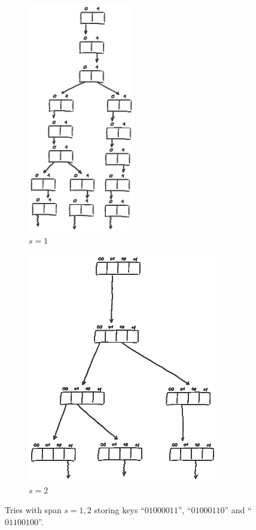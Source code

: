 \documentclass[abstracton,12pt]{scrartcl}
\theoremstyle{definition}
\begin{document}
\begin{figure}[h]
  \centering
  \begin{subfigure}[b]{0.4\textwidth}
    \includegraphics[height=10cm,trim={2cm 17.5cm 2.5cm 1.5cm},clip]{trie_s1_draw}
    \caption{$s=1$}
  \end{subfigure}
  \begin{subfigure}[b]{0.55\textwidth}
    \includegraphics[height=10cm,trim={2cm 18.5cm 2.5cm 0.5cm},clip]{trie_s2_draw}
    \caption{$s=2$}
  \end{subfigure}
  \caption{
    Tries with span $s=1,2$ storing keys ``$01000011$'', ``$01000110$''
    and ``$01100100$''.
  }
  \label{fig:span}
\end{figure}
\end{document}
